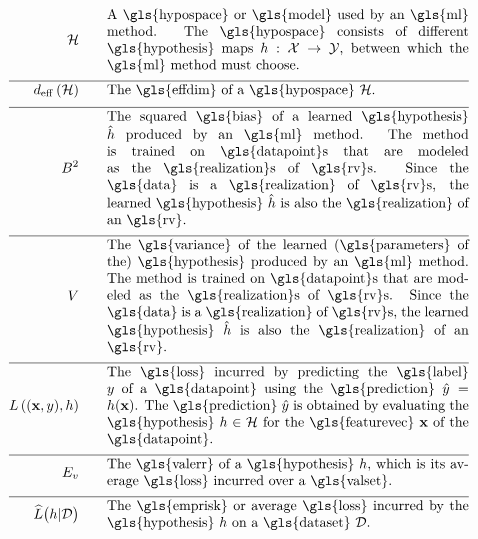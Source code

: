 \begin{align}
	\hypospace  \quad\quad & \parbox{.75\textwidth}{A \gls{hypospace} or \gls{model} used by an \gls{ml} method. 
		The \gls{hypospace} consists of different \gls{hypothesis} maps $\hypothesis: \featurespace \rightarrow \labelspace$, between which 
		the \gls{ml} method must choose.}   \nonumber \\[2mm] \hline \nonumber\\[-5mm]
	\effdim{\hypospace}  \quad\quad & \parbox{.75\textwidth}{The \gls{effdim} of a \gls{hypospace} $\hypospace$.}   \nonumber \\[2mm] \hline \nonumber\\[-5mm]
	\biasterm^2 \quad\quad &\parbox{.75\textwidth}{
		The squared \gls{bias} of a learned \gls{hypothesis} $\learnthypothesis$ 
		produced by an \gls{ml} method. The method is trained on \gls{datapoint}s 
		that are modeled as the \gls{realization}s of \gls{rv}s. Since the \gls{data} is a \gls{realization} 
		of \gls{rv}s, the learned \gls{hypothesis} $\learnthypothesis$ is also the \gls{realization} 
		of an \gls{rv}.} \nonumber  \nonumber \\[2mm] \hline \nonumber\\[-5mm]
	\varianceterm \quad\quad &\parbox{.75\textwidth}{The \gls{variance} of the learned 
		(\gls{parameters} of the) \gls{hypothesis} produced by an \gls{ml} method. 
		The method is trained on \gls{datapoint}s that are modeled as the \gls{realization}s 
		of \gls{rv}s. Since the \gls{data} is a \gls{realization} of \gls{rv}s, the learned \gls{hypothesis} $\learnthypothesis$ is also the \gls{realization} 
		of an \gls{rv}.} \nonumber \nonumber \\[2mm] \hline \nonumber\\[-5mm]
	\lossfunc{(\featurevec,\truelabel)}{\hypothesis}  \quad\quad & \parbox{.75\textwidth}{The \gls{loss} incurred by predicting the 
		\gls{label} $\truelabel$ of a \gls{datapoint} using the \gls{prediction} $\hat{\truelabel}=h(\featurevec)$. The 
		\gls{prediction} $\hat{\truelabel}$ is obtained by evaluating the \gls{hypothesis} $\hypothesis \in \hypospace$ for 
		the \gls{featurevec} $\featurevec$ of the \gls{datapoint}.}    \nonumber  \nonumber \\[2mm] \hline \nonumber\\[-5mm] 
	\valerror \quad\quad &\parbox{.75\textwidth}{The \gls{valerr} of a \gls{hypothesis} $\hypothesis$, which is its 
		average \gls{loss} incurred over a \gls{valset}.}  \nonumber \\[2mm] \hline \nonumber\\[-5mm]
	\emperror\big(\hypothesis| \dataset \big) \quad\quad &\parbox{.75\textwidth}{The \gls{emprisk} or average \gls{loss} 
		incurred by the \gls{hypothesis} $\hypothesis$ on a \gls{dataset} $\dataset$.} \nonumber                           
\end{align}     


